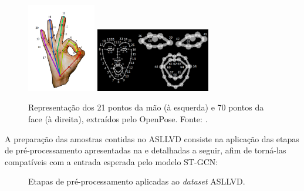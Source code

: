 \begin{figure}[ht]
    \centering
    \includegraphics[width=3cm]{images/keypoints_hand}
    \includegraphics[width=5cm]{images/keypoints_face}
    \caption{Representação dos 21 pontos da mão (à esquerda) e 70 pontos da face (à direita), extraídos pelo OpenPose. Fonte: \cite{openpose-output-2018}.}
    \label{fig:keypoints-face-hand}
\end{figure}


A preparação das amostras contidas no ASLLVD consiste na aplicação das etapas de pré-processamento apresentadas na  e detalhadas a seguir, afim de torná-las compatíveis com a entrada esperada pelo modelo ST-GCN:

\begin{figure}[ht]
    \centering
    \caption{Etapas de pré-processamento aplicadas ao \textit{dataset} ASLLVD.}
    \label{fig:preprocessamento}
\end{figure}


